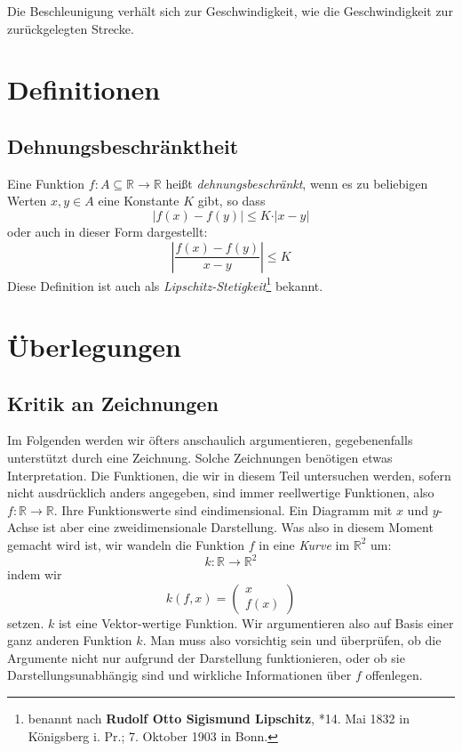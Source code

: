 \begin{fancyquotes}
Die Beschleunigung verhält sich zur Geschwindigkeit, wie die Geschwindigkeit zur zurückgelegten Strecke. 
\end{fancyquotes}

\section{Definitionen}

\subsection{Dehnungsbeschränktheit}

\begin{definition}\label{def:lipschitz}
Eine Funktion $f : A \subseteq \mathbb{R} \longrightarrow \mathbb{R}$ heißt \emph{dehnungsbeschränkt}, wenn es zu beliebigen Werten $x,y\in A$ eine Konstante $K$ gibt, so dass
\[
\left\vert f(x)-f(y)  \right\vert \le K\cdot \vert x-y \vert
\]
oder auch in dieser Form dargestellt:
\[
\left\vert \frac{f(x)-f(y)}{x-y}  \right\vert \le K
\]
Diese Definition ist auch als \emph{Lipschitz-Stetigkeit}\footnote{benannt nach \textbf{Rudolf Otto Sigismund Lipschitz}, *14. Mai 1832 in Königsberg i. Pr.; 7. Oktober 1903 in Bonn.} bekannt.
\end{definition}


\section{Überlegungen}


\subsection{Kritik an Zeichnungen}

Im Folgenden werden wir öfters anschaulich argumentieren, gegebenenfalls unterstützt durch eine Zeichnung. Solche Zeichnungen benötigen etwas Interpretation. Die Funktionen, die wir in diesem Teil untersuchen werden, sofern nicht ausdrücklich anders angegeben, sind immer reellwertige Funktionen, also $f:\mathbb{R} \longrightarrow \mathbb{R}$. Ihre Funktionswerte sind eindimensional. Ein Diagramm mit $x$ und $y$-Achse ist aber eine zweidimensionale Darstellung. Was also in diesem Moment gemacht wird ist, wir wandeln die Funktion $f$ in eine \emph{Kurve} im $\mathbb{R}^2$ um:
\[
k : \mathbb{R} \longrightarrow \mathbb{R}^2
\]
indem wir 
\[
k(f,x) = \begin{pmatrix}
x \\
f(x)
\end{pmatrix}
\]
setzen. $k$ ist eine Vektor-wertige Funktion. Wir argumentieren also auf Basis einer ganz anderen Funktion $k$. Man muss also vorsichtig sein und überprüfen, ob die Argumente nicht nur aufgrund der Darstellung funktionieren, oder ob sie Darstellungsunabhängig sind und wirkliche Informationen über $f$ offenlegen. 

